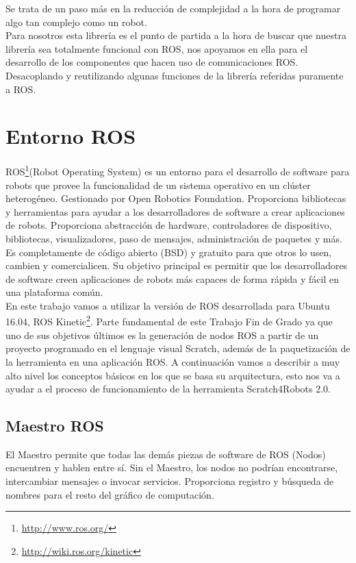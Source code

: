 Se trata de un paso más en la reducción de complejidad a la hora de programar algo tan complejo como un robot.\\

Para nosotros esta librería es el punto de partida a la hora de buscar que nuestra librería sea totalmente funcional con ROS, nos apoyamos en ella para el desarrollo de los componentes que hacen uso de comunicaciones ROS. Desacoplando y reutilizando algunas funciones de la librería referidas puramente a ROS.


\section{Entorno ROS}
\label{sec:ros}
ROS\footnote{\url{http://www.ros.org/}}(Robot Operating System) es un entorno para el desarrollo de software para robots que provee la funcionalidad de un sistema operativo en un clúster heterogéneo. Gestionado por Open Robotics Foundation. Proporciona bibliotecas y herramientas para ayudar a los desarrolladores de software a crear aplicaciones de robots. Proporciona abstracción de hardware, controladores de dispositivo, bibliotecas, visualizadores, paso de mensajes, administración de paquetes y más.\\

Es completamente de código abierto (BSD) y gratuito para que otros lo usen, cambien y comercialicen. Su objetivo principal es permitir que los desarrolladores de software creen aplicaciones de robots más capaces de forma rápida y fácil en una plataforma común. \\

En este trabajo vamos a utilizar la versión de ROS desarrollada para Ubuntu 16.04, ROS Kinetic\footnote{\url{http://wiki.ros.org/kinetic}}. Parte fundamental de este Trabajo Fin de Grado ya que uno de sus objetivos últimos es la generación de nodos ROS a partir de un proyecto programado en el lenguaje visual Scratch, además de la paquetización de la herramienta en una aplicación ROS. A continuación vamos a describir a muy alto nivel los conceptos básicos en los que se basa su arquitectura, esto nos va a ayudar a el proceso de funcionamiento de la herramienta Scratch4Robots 2.0.\\


\subsection{Maestro ROS}
El Maestro permite que todas las demás piezas de software de ROS (Nodos) encuentren y hablen entre sí. Sin el Maestro, los nodos no podrían encontrarse, intercambiar mensajes o invocar servicios. Proporciona registro y búsqueda de nombres para el resto del gráfico de computación.

